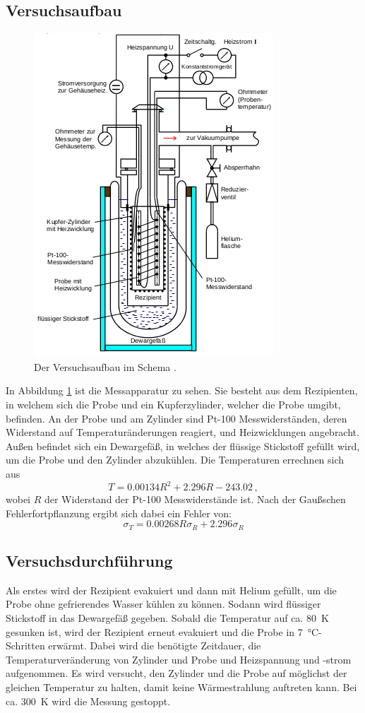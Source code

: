 \subsection{Versuchsaufbau}
\begin{figure}
  \centering
  \includegraphics[scale=0.5]{aufbau.png}
  \caption{Der Versuchsaufbau im Schema \cite{anleitung}.}
  \label{fig:1}
\end{figure}
In Abbildung \ref{fig:1} ist die Messapparatur zu sehen. Sie besteht aus dem Rezipienten,
in welchem sich die Probe und ein Kupferzylinder, welcher die Probe umgibt, befinden.
An der Probe und am Zylinder sind Pt-100 Messwiderständen,
deren Widerstand auf Temperaturänderungen reagiert, und Heizwicklungen angebracht.
Außen befindet sich ein Dewargefäß,
in welches der flüssige Stickstoff gefüllt wird, um die Probe und den Zylinder abzukühlen.
Die Temperaturen errechnen sich aus
\begin{equation}
  T = 0.00134 R^2 + 2.296 R - 243.02 \, ,
  \label{widerstand}
\end{equation}
wobei $R$ der Widerstand der Pt-100 Messwiderstände ist. Nach der Gaußschen
Fehlerfortpflanzung ergibt sich dabei ein Fehler von:
\begin{equation}
  \sigma_T = 0.00268 R \sigma_R + 2.296 \sigma_R
\end{equation}

\subsection{Versuchsdurchführung}
Als erstes wird der Rezipient evakuiert und dann mit Helium gefüllt, um die Probe
ohne gefrierendes Wasser kühlen zu können. Sodann wird flüssiger Stickstoff in das
Dewargefäß gegeben. Sobald die Temperatur auf ca. \SI{80}{\kelvin} gesunken ist,
wird der Rezipient erneut evakuiert und die Probe in \SI{7}{\celsius}-
Schritten erwärmt. Dabei wird die benötigte Zeitdauer, die Temperaturveränderung
von Zylinder und Probe und Heizspannung und -strom aufgenommen. Es wird versucht,
den Zylinder und die Probe auf möglichst der gleichen Temperatur zu halten, damit
keine Wärmestrahlung auftreten kann. Bei ca. \SI{300}{\kelvin}
wird die Messung gestoppt.
